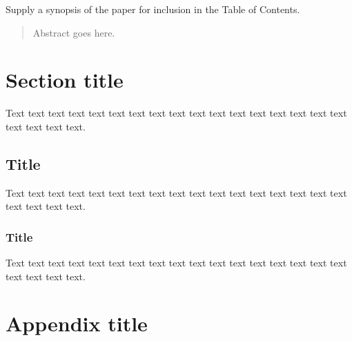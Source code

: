 \documentclass[preprint]{iucr}              %
\begin{document}
\begin{synopsis}
Supply a synopsis of the paper for inclusion in the Table of Contents.
\end{synopsis}

\begin{abstract}
Abstract goes here.
\end{abstract}



\section{Section title}

Text text text text text text text text text text text text text text
text text text text text text text.

\subsection{Title}

Text text text text text text text text text text text text text text
text text text text text text text.

\subsubsection{Title}

Text text text text text text text text text text text text text text
text text text text text text text.



\appendix
\section{Appendix title}
\end{document}
